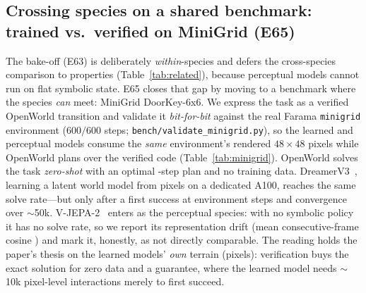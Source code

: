 \documentclass[11pt]{article}
\begin{document}
\begin{table}[htb]\centering\small

\caption{\textbf{World-model bake-off (E63).} Every world model we can run
locally, on shared symbolic tasks; probe/rollout averaged over sprint and triage
(5 seeds, $K{=}10{,}000$). $^\dagger$LLM rows from E10/E11/E22. Verified code is the
only model exact, OOD-robust, optimal-for-control, auditable, \emph{and} zero-data.
Perceptual world models (Dreamer/V-JEPA/Genie/Sora/$\ldots$) are a different species,
compared on properties in Table~\ref{tab:related}.}
\label{tab:bakeoff}
\end{table}

\subsection{Crossing species on a shared benchmark: trained vs.\ verified on MiniGrid (E65)}\label{sec:minigrid}
The bake-off (E63) is deliberately \emph{within}-species and defers the cross-species
comparison to properties (Table~\ref{tab:related}), because perceptual models cannot
run on flat symbolic state. E65 closes that gap by moving to a benchmark where the
species \emph{can} meet: MiniGrid DoorKey-6x6. We express the task as a verified
OpenWorld transition and validate it \emph{bit-for-bit} against the real Farama
\texttt{minigrid} environment ($600/600$ steps; \texttt{bench/validate\_minigrid.py}),
so the learned and perceptual models consume the \emph{same} environment's rendered
$48\times48$ pixels while OpenWorld plans over the verified code
(Table~\ref{tab:minigrid}). OpenWorld solves the task \emph{zero-shot} with an optimal
\MGOpenWorldPlan-step plan and no training data. DreamerV3~\cite{dreamerv3}, learning a
latent world model from pixels on a dedicated A100, reaches the same
\MGDreamerFinalSolve{} solve rate---but only after a first success at
\MGDreamerFirstSolve{} environment steps and convergence over $\sim$50k.
V-JEPA-2~\cite{vjepa2025} enters as the perceptual species: with no symbolic policy it
has no solve rate, so we report its representation drift (mean consecutive-frame cosine
\MGVjepaCosine) and mark it, honestly, as not directly comparable. The reading holds
the paper's thesis on the learned models' \emph{own} terrain (pixels): verification
buys the exact solution for zero data and a guarantee, where the learned model needs
$\sim$10k pixel-level interactions merely to first succeed.

\begin{table}[htb]\centering\small

\caption{\textbf{Trained vs.\ verified on a shared benchmark (E65).} MiniGrid
DoorKey-6x6, with OpenWorld's transition validated bit-for-bit against Farama
\texttt{minigrid}; DreamerV3 (1 seed, A100) and V-JEPA-2 consume the same
environment's rendered pixels. V-JEPA is perceptual (no symbolic policy), hence a
representation-drift metric rather than a solve rate.}
\label{tab:minigrid}
\end{table}
\end{document}

